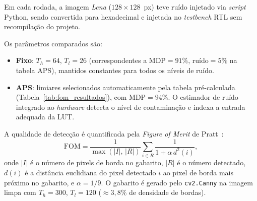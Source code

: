 Em cada rodada, a imagem \textit{Lena} ($128\times128$~px) teve ruído injetado via
\textit{script} Python, sendo convertida para hexadecimal e injetada no \textit{testbench}
RTL sem recompilação do projeto.

Os parâmetros comparados são:

\begin{itemize}
    \item \textbf{Fixo}: $T_h = 64$, $T_l = 26$ (correspondentes a $\mathrm{MDP}=91\%$,
          ruído$=5\%$ na tabela APS), mantidos constantes para todos os níveis de ruído.
    \item \textbf{APS}: limiares selecionados automaticamente pela tabela
          pré-calculada (Tabela~\ref{tab:fom_resultados}), com $\mathrm{MDP}=94\%$.
          O estimador de ruído integrado ao \textit{hardware} detecta o nível de
          contaminação e indexa a entrada adequada da LUT.
\end{itemize}

A qualidade de detecção é quantificada pela \textit{Figure of Merit} de
Pratt~\cite{pratt1978digital}:
\begin{equation}
    \mathrm{FOM} = \frac{1}{\max(|I|,\,|R|)}
                   \sum_{i \in R} \frac{1}{1 + \alpha\, d^2(i)},
    \label{eq:fom}
\end{equation}
onde $|I|$ é o número de pixels de borda no gabarito, $|R|$ é o número detectado,
$d(i)$ é a distância euclidiana do pixel detectado $i$ ao pixel de borda mais próximo
no gabarito, e $\alpha = 1/9$. O gabarito é gerado pelo \texttt{cv2.Canny} na imagem
limpa com $T_h = 300$, $T_l = 120$ ($\approx 3{,}8\%$ de densidade de bordas).

